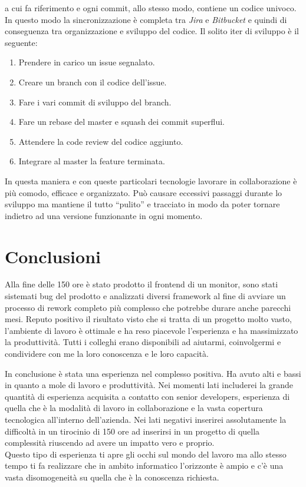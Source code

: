 \documentclass[a4paper]{article}
\begin{document}
a cui fa riferimento e ogni commit, allo stesso modo, contiene un codice univoco.
In questo modo la sincronizzazione è completa tra \emph{Jira} e \emph{Bitbucket} e quindi
di conseguenza tra organizzazione e sviluppo del codice.
Il solito iter di sviluppo è il seguente:
\begin{enumerate}
	\item Prendere in carico un issue segnalato.
	\item Creare un branch con il codice dell'issue.
	\item Fare i vari commit di sviluppo del branch.
	\item Fare un rebase del master e squash dei commit superflui.
	\item Attendere la code review del codice aggiunto.
	\item Integrare al master la feature terminata.
\end{enumerate}
\par In questa maniera e con queste particolari tecnologie lavorare in collaborazione
è più comodo, efficace e organizzato. Può causare eccessivi passaggi durante lo sviluppo
ma mantiene il tutto ``pulito'' e tracciato in modo da poter tornare indietro ad una
versione funzionante in ogni momento. 

\section{Conclusioni}
\par Alla fine delle 150 ore è stato prodotto il frontend di un monitor, sono stati
sistemati bug del prodotto e analizzati diversi framework al fine di avviare un
processo di rework completo più complesso che potrebbe durare anche parecchi mesi. Reputo positivo il risultato
visto che si tratta di un progetto molto vasto, l'ambiente di lavoro è ottimale e ha reso piacevole
l'esperienza e ha massimizzato la produttività. Tutti i colleghi erano disponibili ad 
aiutarmi, coinvolgermi e condividere con me la loro conoscenza e le loro capacità.
\par In conclusione è stata una esperienza nel complesso positiva. Ha avuto alti e bassi in quanto 
a mole di lavoro e produttività. Nei momenti lati includerei la grande quantità
di esperienza acquisita a contatto con senior developers, esperienza di quella che è
la modalità di lavoro in collaborazione e la vasta copertura tecnologica all'interno
dell'azienda. Nei lati negativi inserirei assolutamente la difficoltà in un tirocinio
di 150 ore ad inserirsi in un progetto di quella complessità riuscendo ad avere un 
impatto vero e proprio. \\
Questo tipo di esperienza ti apre gli occhi sul mondo del lavoro ma allo stesso tempo
ti fa realizzare che in ambito informatico l'orizzonte è ampio e c'è una vasta disomogeneità
su quella che è la conoscenza richiesta.
\end{document}

